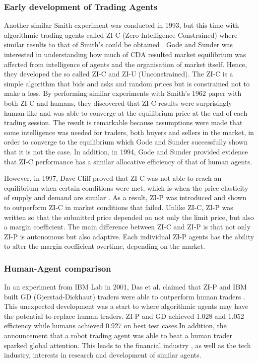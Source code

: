 \documentclass{article}
\begin{document}
\subsubsection{Early development of Trading Agents}
Another similar Smith experiment was conducted in 1993, but this time with algorithmic trading agents called ZI-C (Zero-Intelligence Constrained) where similar results to that of Smith’s could be obtained \cite{godesunder93}. Gode and Sunder was interested in understanding how much of CDA resulted market equilibrium was affected from intelligence of agents and the organisation of market itself. Hence, they developed the so called ZI-C and ZI-U (Unconstrained). The ZI-C is a simple algorithm that bids and asks and random prices but is constrained not to make a loss. By performing similar experiments with Smith’s 1962 \cite{smith1962} paper with both ZI-C and humans, they discovered that ZI-C results were surprisingly human-like and was able to converge at the equilibrium price at the end of each trading session. The result is remarkable because assumptions were made that some intelligence was needed for traders, both buyers and sellers in the market, in order to converge to the equilibrium which Gode and Sunder successfully shown that it is not the case. In addition, in 1994, Gode and Sunder provided evidence that ZI-C performance has a similar allocative efficiency of that of human agents. 

However, in 1997, Dave Cliff proved that ZI-C was not able to reach an equilibrium when certain conditions were met, which is when the price elasticity of supply and demand are similar \cite{zip1997}. As a result, ZI-P was introduced and shown to outperform ZI-C in market conditions that failed. Unlike ZI-C, ZI-P was written so that the submitted price depended on not only the limit price, but also a margin coefficient. The main difference between ZI-C and ZI-P is that not only ZI-P is autonomous but also adaptive. Each individual ZI-P agents has the ability to alter the margin coefficient overtime, depending on the market. 

\subsubsection{Human-Agent comparison}
In an experiment from IBM Lab in 2001, Das et al. claimed that ZI-P and IBM built GD (Gjerstad-Dickhaut) traders were able to outperform human traders \cite{das2001}. This unexpected development was a start to where algorithmic agents may have the potential to replace human traders. ZI-P and GD achieved 1.028 and 1.052 efficiency while humans achieved 0.927 on best test cases.In addition, the announcement that a robot trading agent was able to beat a human trader sparked global attention. This leads to the financial industry , as well as the tech industry, interests in research and development of similar agents. 
\end{document}
